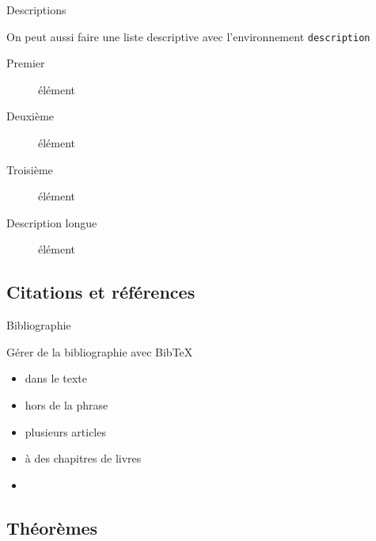 \documentclass[french]{beamer}
\begin{document}
  \begin{frame}[fragile]{Descriptions}
    \begin{block}{}
      On peut aussi faire une liste descriptive avec l'environnement \verb|description|
        \begin{description}
          \item[Premier] élément
          \item[Deuxième] élément
          \item[Troisième] élément
          \item[Description longue] élément
        \end{description}
    \end{block}
  \end{frame}
  
  \subsection{Citations et références}
  
  \begin{frame}{Bibliographie}
    \begin{block}{}
      Gérer de la bibliographie avec Bib\TeX
      \begin{itemize}
        \item dans le texte \citet{Lamport1986}
        \item hors de la phrase \citep{Lamport1986}
        \item plusieurs articles \citep{GoossensMS1994, GoossensRM1997, Klockl2000, Dongen2012}
        \item à des chapitres de livres \citep[chap 2]{Gratzer2014}
        \item \citep[voir ][]{Datta2017}
      \end{itemize}
    \end{block}
  \end{frame}
  
  \subsection{Théorèmes}
  
\end{document}
